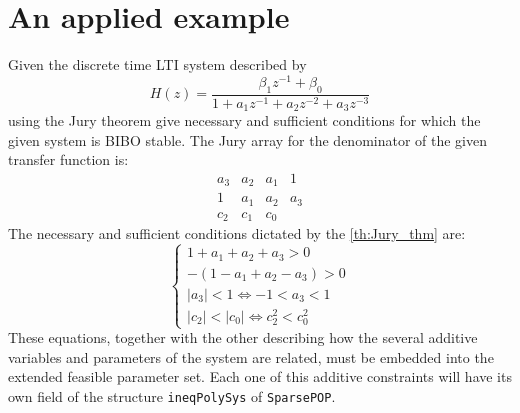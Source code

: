 \section{An applied example}
Given the discrete time LTI system described by
\begin{equation}
    H(z)=\frac{\beta_1{z^{-1}}+\beta_0}{1+a_1{z^{-1}}+a_2{z^{-2}}+a_3{z^{-3}}}
\end{equation}
using the Jury theorem give necessary and sufficient conditions for which the given system is BIBO stable. 
\noindent
The Jury array for the denominator of the given transfer function is:
\begin{equation}
    \begin{matrix}
        a_3&a_2&a_1&1\\
        1&a_1&a_2&a_3\\
        c_2&c_1&c_0
    \end{matrix}
\end{equation}
The necessary and sufficient conditions dictated by the \cref{th:Jury_thm} are:
\begin{equation}
    \begin{cases}
        1+a_1+a_2+a_3>0\\
        -(1-a_1+a_2-a_3)>0\\
        \vert a_3 \vert < 1 \iff -1 < a_3 < 1\\
        \vert c_2 \vert < \vert c_0 \vert \iff c_2^2 < c_0^2
    \end{cases}
\end{equation}
These equations, together with the other describing how the several additive variables and parameters of the system are related, must be embedded into the extended feasible parameter set. Each one of this additive constraints will have its own field of the structure \texttt{ineqPolySys} of \texttt{SparsePOP}.